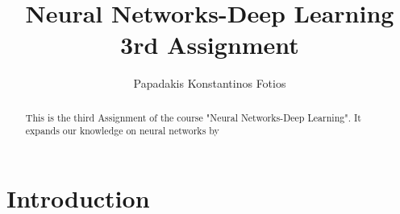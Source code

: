 \documentclass[lettersize,journal]{IEEEtran}
\begin{document}
\title{Neural Networks-Deep Learning \\ 3rd Assignment}
\author{Papadakis Konstantinos Fotios}
\maketitle

\begin{abstract}
This is the third Assignment of the course "Neural Networks-Deep Learning". It expands our 
knowledge on neural networks by 
\end{abstract}

\section{Introduction}

\vfill
\end{document}
